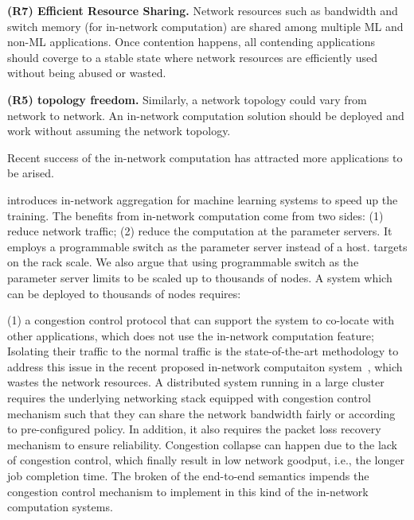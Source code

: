 \textbf{(R7) Efficient Resource Sharing.} Network resources such as bandwidth and switch memory (for in-network computation) are shared among multiple ML and non-ML applications. Once contention happens, all contending applications should coverge to a stable state where network resources are efficiently used without being abused or wasted.


\textbf{(R5) topology freedom.} Similarly, a network topology could vary from network to network. An in-network computation solution should be deployed and work without assuming the network topology.


Recent success of the in-network computation has attracted more 
applications to be arised.  

\switchml introduces in-network aggregation for machine learning systems
to speed up the training. The benefits from in-network computation 
come from two sides: (1) reduce network traffic; (2) reduce the computation
at the parameter servers. 
It employs a programmable switch as the parameter server instead of a host. 
\switchml targets on the rack scale. We also argue that using programmable switch
as the parameter server limits \switchml to be scaled up to 
thousands of nodes. A system which can be deployed to thousands of nodes requires:


(1) a congestion control protocol that can support the system to
co-locate with other applications, which does not use the in-network computation feature;
Isolating their traffic to the normal traffic is the state-of-the-art methodology to 
address this issue in the recent proposed in-network computaiton system~\cite{netcache, netchain, harmonia, switchml}, which wastes the network resources. 
A distributed system running in a large cluster requires the underlying networking stack equipped with 
congestion control mechanism such that they can share the network
bandwidth fairly or according to pre-configured policy.
In addition, it also requires the packet loss recovery mechanism to ensure 
reliability. Congestion collapse can happen due to the lack of congestion control, 
which finally result in low network goodput, i.e., the longer job completion time. 
The broken of the end-to-end semantics impends the congestion control mechanism to implement
in this kind of the in-network computation systems. 


